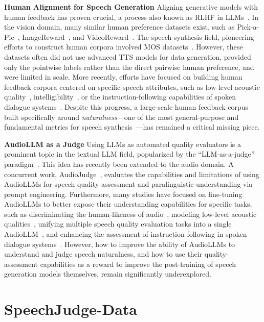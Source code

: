 \documentclass[]{bytedance_seed}
\begin{document}
\textbf{Human Alignment for Speech Generation}\quad
Aligning generative models with human feedback has proven crucial, a process also known as RLHF in LLMs~\citep{instructgpt,RLHF-anthoropic}. In the vision domain, many similar human preference datasets exist, such as Pick-a-Pic~\citep{pick-a-pic}, ImageReward~\citep{imagereward}, and VideoReward~\citep{videoreward}. The speech synthesis field, pioneering efforts to construct human corpora involved MOS datasets~\citep{utmos,voicemos-challenge-2024}. However, these datasets often did not use advanced TTS models for data generation, provided only the pointwise labels rather than the direct pairwise human preference, and were limited in scale. More recently, efforts have focused on building human feedback corpora centered on specific speech attributes, such as low-level acoustic quality~\citep{qualispeech}, intelligibility~\citep{intp}, or the instruction-following capabilities of spoken dialogue systems~\citep{wavreward,sagelm}. Despite this progress, a large-scale human feedback corpus built specifically around \textit{naturalness}—one of the most general-purpose and fundamental metrics for speech synthesis~\citep{tts-book-paul-taylor,tts-book-tanxu}—has remained a critical missing piece.

\textbf{AudioLLM as a Judge}\quad
Using LLMs as automated quality evaluators is a prominent topic in the textual LLM field, popularized by the ``LLM-as-a-judge'' paradigm~\citep{llm-as-a-judge}. This idea has recently been extended to the audio domain. A concurrent work, AudioJudge~\citep{audiojudge}, evaluates the capabilities and limitations of using AudioLLMs for speech quality assessment and paralinguistic understanding via prompt engineering. Furthermore, many studies have focused on fine-tuning AudioLLMs to better expose their understanding capabilities for specific tasks, such as discriminating the human-likeness of audio~\citep{audio-turing-test}, modeling low-level acoustic qualities~\citep{chenchen-quality-audiollm,qualispeech}, unifying multiple speech quality evaluation tasks into a single AudioLLM~\citep{sq-llm}, and enhancing the assessment of instruction-following in spoken dialogue systems~\citep{wavreward,sagelm}. However, how to improve the ability of AudioLLMs to understand and judge speech {naturalness}, and how to use their quality-assessment capabilities as a reward to improve the post-training of speech generation models themselves, remain significantly underexplored.


\section{SpeechJudge-Data}
\end{document}
